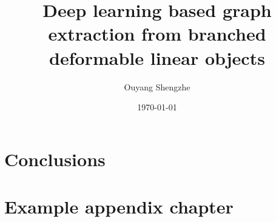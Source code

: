 \documentclass[ a4paper,
                oneside,
                toc=bibliography,
                toc=listof
                ]{scrbook}
\author{Ouyang Shengzhe}
\title{Deep learning based graph extraction from branched deformable linear objects}
\date{\today}
\begin{document}
 
    \frontmatter
    \makeISWtitle

	\cleardoublepage
	\setcounter{page}{1} %
    \declarationOfOriginality

    
    
    \cleardoublepage
    \tableofcontents
       

    \mainmatter
    


    
    
    
    
    
    
    
    
    
    \chapter{Conclusions}

    
    \cleardoublepage
    \printbibliography
    
     \cleardoublepage
    
    
    \cleardoublepage
    \listoffigures
    
    \cleardoublepage
    \listoftables
    
    
    
    \appendix
    \chapter{Example appendix chapter}
\end{document}

